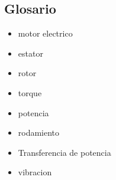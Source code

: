
\subsection{Glosario}

\begin{itemize}
    \item motor electrico
    \item estator
    \item rotor
    \item torque
    \item potencia
    \item rodamiento
    \item Transferencia de potencia
    \item vibracion
\end{itemize}


